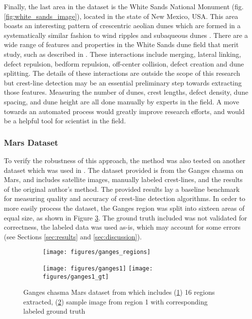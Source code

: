 Finally, the last area in the dataset is the White Sands National Monument (fig. \ref{fig:white_sands_image}), located in the state of New Mexico, USA. This area boasts an interesting pattern of crescentric aeolian dunes which are formed in a systematically similar fashion to wind ripples and subaqueous dunes \cite{ewing_aeolian_dune_interaction_white_sands}. There are a wide range of features and properties in the White Sands dune field that merit study, such as described in \cite{ewing_aeolian_dune_interaction_white_sands}. These interactions include merging, lateral linking, defect repulsion, bedform repulsion, off-center collision, defect creation and dune splitting. The details of these interactions are outside the scope of this research but crest-line detection may be an essential preliminary step towards extracting those features. Measuring the number of dunes, crest lengths, defect density, dune spacing, and dune height are all done manually by experts in the field. A move towards an automated process would greatly improve research efforts, and would be a helpful tool for scientist in the field.

\subsubsection{Mars Dataset}
\label{subsec:mars_dataset}
To verify the robustness of this approach, the method was also tested on another dataset which was used in \cite{vaz_object_based_dune_analysis}. The dataset provided is from the Ganges chasma on Mars, and includes satellite images, manually labeled crest-lines, and the results of the original author's method. The provided results lay a baseline benchmark for measuring quality and accuracy of crest-line detection algorithms. In order to more easily process the dataset, the Ganges region was split into sixteen areas of equal size, as shown in Figure \ref{fig:mars_ganges_dataset}. The ground truth included was not validated for correctness, the labeled data was used as-is, which may account for some errors (see Sections \ref{sec:results} and \ref{sec:discussion}).

\begin{figure}
	\centering
	\begin{subfigure}{\textwidth}
		\centering
		\texttt{[image: figures/ganges\_regions]}
		\caption{}
		\label{fig:ganges_regions}
	\end{subfigure}
	\begin{subfigure}{\textwidth}
		\centering
		\texttt{[image: figures/ganges1]}
		\texttt{[image: figures/ganges1\_gt]}
		\caption{}
		\label{fig:ganges1_image}
	\end{subfigure}
	
	\caption{Ganges chasma Mars dataset from \cite{vaz_object_based_dune_analysis} which includes (\ref{fig:ganges_regions}) 16 regions extracted, (\ref{fig:ganges1_image}) sample image from region 1 with corresponding labeled ground truth}
	\label{fig:mars_ganges_dataset}
\end{figure}


